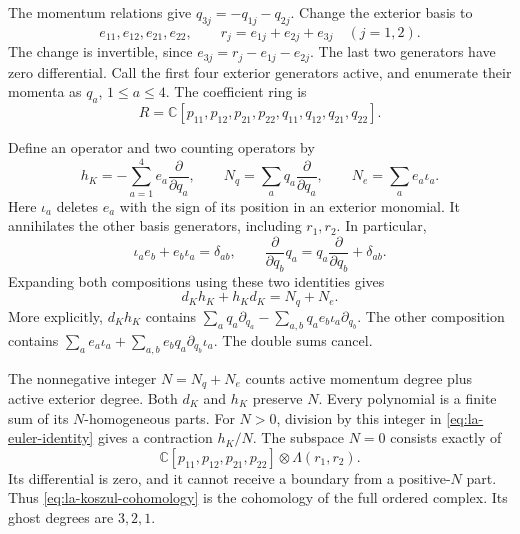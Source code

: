 The momentum relations give $q_{3j}=-q_{1j}-q_{2j}$.
Change the exterior basis to
\begin{equation}\label{eq:la-redundant-generators}
 e_{11},e_{12},e_{21},e_{22},\qquad
 r_j=e_{1j}+e_{2j}+e_{3j}\quad(j=1,2).
\end{equation}
The change is invertible, since
$e_{3j}=r_j-e_{1j}-e_{2j}$. The last two generators have zero
differential. Call the first four exterior generators active,
and enumerate their momenta as $q_a$, $1\leq a\leq4$.
The coefficient ring is
\[
 R=\mathbb C[p_{11},p_{12},p_{21},p_{22},
             q_{11},q_{12},q_{21},q_{22}].
\]

Define an operator and two counting operators by
\begin{equation}\label{eq:la-koszul-homotopy}
 h_K=-\sum_{a=1}^4e_a\frac{\partial}{\partial q_a},
 \qquad
 N_q=\sum_aq_a\frac{\partial}{\partial q_a},
 \qquad N_e=\sum_ae_a\iota_a.
\end{equation}
Here $\iota_a$ deletes $e_a$ with the sign of its position in
an exterior monomial. It annihilates the other basis generators,
including $r_1,r_2$. In particular,
\[
 \iota_a e_b+e_b\iota_a=\delta_{ab},\qquad
 \frac{\partial}{\partial q_b}q_a
       =q_a\frac{\partial}{\partial q_b}+\delta_{ab}.
\]
Expanding both compositions using these two identities gives
\begin{equation}\label{eq:la-euler-identity}
 d_Kh_K+h_Kd_K=N_q+N_e.
\end{equation}
More explicitly, $d_Kh_K$ contains
$\sum_aq_a\partial_{q_a}
 -\sum_{a,b}q_ae_b\iota_a\partial_{q_b}$.
The other composition contains
$\sum_ae_a\iota_a
 +\sum_{a,b}e_bq_a\partial_{q_b}\iota_a$.
The double sums cancel.

The nonnegative integer $N=N_q+N_e$ counts active momentum
degree plus active exterior degree. Both $d_K$ and $h_K$
preserve $N$. Every polynomial is a finite sum of its
$N$-homogeneous parts. For $N>0$, division by this integer in
\eqref{eq:la-euler-identity} gives a contraction $h_K/N$.
The subspace $N=0$ consists exactly of
\begin{equation}\label{eq:la-koszul-cohomology}
 \mathbb C[p_{11},p_{12},p_{21},p_{22}]
                       \otimes\Lambda(r_1,r_2).
\end{equation}
Its differential is zero, and it cannot receive a boundary
from a positive-$N$ part. Thus \eqref{eq:la-koszul-cohomology}
is the cohomology of the full ordered complex. Its ghost
degrees are $3,2,1$.

